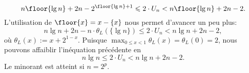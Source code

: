 \begin{equation*}
n\floor{\lg n} + 2n - 2^{\floor{\lg n}+1}
\leqslant 2 \cdot U_n < n\floor{\lg n} + 2n - 2.
\end{equation*}
L'utilisation de \(\floor{x} = x - \{x\}\) nous permet d'avancer un
peu plus:
\begin{equation*}
n\lg n + 2n - n\cdot\theta_L(\{\lg n\})
\leqslant 2 \cdot U_n < n\lg n + 2n - 2,
\end{equation*}
où \(\theta_L(x) := x + 2^{1 - x}\). Puisque \(\max_{0 \leqslant x <
  1}\theta_L(x) = \theta_L(0) = 2\), nous pouvons affaiblir
l'inéquation précédente en
\begin{equation}
n\lg n \leqslant 2 \cdot U_n < n\lg n + 2n - 2.
\label{ineq_Un}
\end{equation}
Le minorant est atteint si \(n=2^p\).

